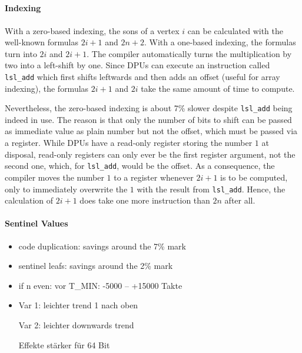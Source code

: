 \subsection{\texorpdfstring{\HS{}}{HeapSort}}
\label{subsec:tasklet:heap}


\paragraph{Indexing}
With a zero-based indexing, the sons of a vertex \(i\) can be calculated with the well-known formulas \(2i + 1\) and \(2n + 2\).
With a one-based indexing, the formulas turn into \(2i\) and \(2i + 1\).
The compiler automatically turns the multiplication by two into a left-shift by one.
Since DPUs can execute an instruction called \texttt{lsl\_add} which first shifts leftwards and then adds an offset (useful \eg{} for array indexing), the formulas \(2i + 1\) and \(2i\) take the same amount of time to compute.

Nevertheless, the zero-based indexing is about 7\% slower despite \texttt{lsl\_add} being indeed in use.
The reason is that only the number of bits to shift can be passed as immediate value as plain number but not the offset, which must be passed via a register.
While DPUs have a read-only register storing the number \(1\) at disposal, read-only registers can only ever be the first register argument, not the second one, which, for \texttt{lsl\_add}, would be the offset.
As a consequence, the compiler moves the number \(1\) to a register whenever \(2i + 1\) is to be computed, only to immediately overwrite the \(1\) with the result from \texttt{lsl\_add}.
Hence, the calculation of \(2i + 1\) does take one more instruction than \(2n\) after all.

\paragraph{Sentinel Values}


\begin{itemize}
	\item
	code duplication:
	savings around the 7\% mark

	\item
	sentinel leafs:
	savings around the 2\% mark

	\item
	if n even: vor T\_MIN: -5000 -- +15000 Takte

	\item
	Var 1:
	leichter trend 1 nach oben

	Var 2:
	leichter downwards trend

	Effekte stärker für 64 Bit
\end{itemize}

